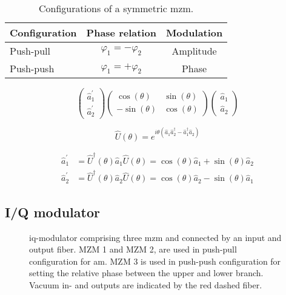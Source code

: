 \begin{table}[htb]
	\centering
	\begin{tabular}{lcc}
		\toprule
		Configuration & Phase relation & Modulation \\
		\midrule
		Push-pull & $\varphi_1=-\varphi_2$ & Amplitude \\
		Push-push & $\varphi_1=+\varphi_2$ & Phase \\
		\bottomrule
	\end{tabular}
	\caption{Configurations of a symmetric \gls{mzm}.}
\end{table}

\begin{equation}
	\begin{pmatrix}
		\hat{a}_1^\prime \\
		\hat{a}_2^\prime
	\end{pmatrix}
		\begin{pmatrix}
			\cos(\theta) & \sin(\theta) \\
			-\sin(\theta) & \cos(\theta)
		\end{pmatrix}
		\begin{pmatrix}
			\hat{a}_1 \\
			\hat{a}_2
		\end{pmatrix}
\end{equation}

\begin{equation}
	\hat{U}(\theta)
	=
	e^{i\theta\left(
		\hat{a}_1
		\hat{a}_2^\dagger
		-
		\hat{a}_1^\dagger
		\hat{a}_2
	\right)}
\end{equation}

\begin{align}
	\hat{a}_1^\prime
	&=
	\hat{U}^\dagger(\theta)
	\hat{a}_1
	\hat{U}(\theta)
	=
	\cos(\theta)
	\hat{a}_1
	+
	\sin(\theta)
	\hat{a}_2
	\\
	\hat{a}_2^\prime
	&=
	\hat{U}^\dagger(\theta)
	\hat{a}_2
	\hat{U}(\theta)
	=
	\cos(\theta)
	\hat{a}_2
	-
	\sin(\theta)
	\hat{a}_1
\end{align}

\subsection{I/Q modulator}

\begin{figure}[htb]
	\centering
	
	\caption{\gls{iq}-modulator comprising three \gls{mzm} and connected by an input and output fiber. MZM 1 and MZM 2, are used in push-pull configuration for \gls{am}. MZM 3 is used in push-push configuration for setting the relative phase between the upper and lower branch. Vacuum in- and outputs are indicated by the red dashed fiber.}
\end{figure}

